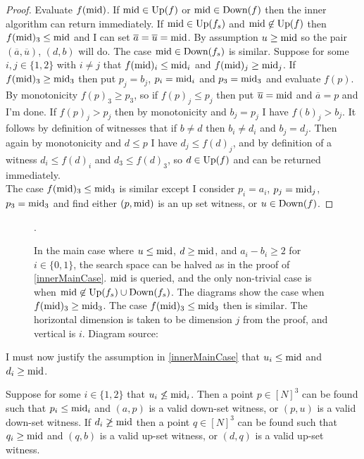 \begin{proof} 
  Evaluate $f(\text{mid})$. If $\text{mid} \in \mathrm{Up}(f)$ or
  $\text{mid} \in \text{Down}(f)$ then the inner algorithm can return immediately. If $\text{mid} \in \mathrm{Up}(f_s)$ and $\text{mid} \not\in \mathrm{Up}(f)$
  then $f(\text{mid})_3 \leq \text{mid}$ and I can set
  $\overline{a} = \overline{u} = \text{mid}$. By assumption $u \geq \text{mid}$ so the pair $(\overline{a}, \overline{u})$, $(d, b)$ will do.
  The case $\text{mid} \in \text{Down}(f_s)$ is similar.
  Suppose for some $i, j \in \{1, 2\}$ with $i \neq j$ that $f(\text{mid})_i \leq \text{mid}_i$ and $f(\text{mid})_j \geq \text{mid}_j$.
  If $f(\text{mid})_3 \geq \text{mid}_3$ then put $p_j = b_j$, $p_i = \text{mid}_i$ and $p_3 = \text{mid}_3$ and evaluate $f(p)$.  
  By monotonicity $f(p)_3 \geq p_3$, so if $f(p)_j \leq p_j$ then put $\overline{u} = \text{mid}$ and $\overline{a} = p$ and I'm done.
  If $f(p)_j > p_j$ then by monotonicity and $b_j = p_j$ I have $f(b)_j > b_j$. It follows by definition of witnesses that if $b \neq d$ then 
  $b_i \neq d_i$ and $b_j = d_j$. Then again by monotonicity and $d \leq p$ I have $d_j \leq f(d)_j$, and by definition
  of a witness $d_i \leq f(d)_i$ and $d_3 \leq f(d)_3$, so $d \in \mathrm{Up}(f)$ and can be returned immediately. \\
  The case $f(\text{mid})_3 \leq \text{mid}_3$ is similar except I consider $p_i = a_i$, $p_j = \text{mid}_j$, $p_3 = \text{mid}_3$ and
  find either $(p, \text{mid})$ is an up set witness, or $u \in \text{Down}(f)$.
\end{proof}
\begin{figure}[ht]
  \centering
  \scalebox{0.5}{}
  \caption{In the main case where $u \leq \text{mid}$, $d \geq \text{mid}$, and $a_i - b_i \geq 2$ for $i \in \{0, 1\}$,
  the search space can be halved as in the proof of \cref{innerMainCase}. $\text{mid}$ is queried, and the only non-trivial
  case is when $\text{mid} \not\in \mathrm{Up}(f_s) \cup \text{Down}(f_s)$. The diagrams show the case when $f(\text{mid})_3 \geq \text{mid}_3$.
  The case $f(\text{mid})_3 \leq \text{mid}_3$ then is similar. The horizontal dimension is taken to be dimension $j$ from the proof,
  and vertical is $i$. Diagram source: \citep{fasterTarski}}.
\end{figure}
I must now justify the assumption in \cref{innerMainCase} that 
$u_i \leq \text{mid}$ and $d_i \geq \text{mid}$.
\begin{lemma}\label{innerOtherCase}
  Suppose for some $i \in \{1, 2\}$ that $u_i \not\leq \text{mid}_i$.
  Then a point $p \in [N]^3$ can be found such that $p_i \leq \text{mid}_i$ and $(a, p)$ is a valid down-set
  witness, or $(p, u)$ is a valid down-set witness. 
  If $d_i \not\geq \text{mid}$ then a point $q \in [N]^3$ can be found such that $q_i \geq \text{mid}$
  and $(q, b)$ is a valid up-set
  witness, or $(d, q)$ is a valid up-set witness. 
\end{lemma}
